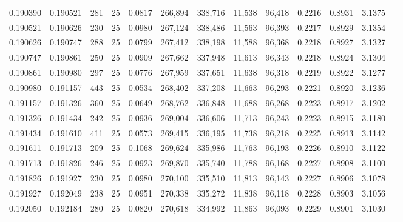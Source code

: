 \begin{tabular}{rrrrrrrrrrrrr}
0.190390 & 0.190521 &   281 &  25 &                                     0.0817 & 266,894 & 338,716 &  11,538 &  96,418 & 0.2216 & 0.8931 & 3.1375 \\
0.190521 & 0.190626 &   230 &  25 &                                     0.0980 & 267,124 & 338,486 &  11,563 &  96,393 & 0.2217 & 0.8929 & 3.1354 \\
0.190626 & 0.190747 &   288 &  25 &                                     0.0799 & 267,412 & 338,198 &  11,588 &  96,368 & 0.2218 & 0.8927 & 3.1327 \\
0.190747 & 0.190861 &   250 &  25 &                                     0.0909 & 267,662 & 337,948 &  11,613 &  96,343 & 0.2218 & 0.8924 & 3.1304 \\
0.190861 & 0.190980 &   297 &  25 &                                     0.0776 & 267,959 & 337,651 &  11,638 &  96,318 & 0.2219 & 0.8922 & 3.1277 \\
0.190980 & 0.191157 &   443 &  25 &                                     0.0534 & 268,402 & 337,208 &  11,663 &  96,293 & 0.2221 & 0.8920 & 3.1236 \\
0.191157 & 0.191326 &   360 &  25 &                                     0.0649 & 268,762 & 336,848 &  11,688 &  96,268 & 0.2223 & 0.8917 & 3.1202 \\
0.191326 & 0.191434 &   242 &  25 &                                     0.0936 & 269,004 & 336,606 &  11,713 &  96,243 & 0.2223 & 0.8915 & 3.1180 \\
0.191434 & 0.191610 &   411 &  25 &                                     0.0573 & 269,415 & 336,195 &  11,738 &  96,218 & 0.2225 & 0.8913 & 3.1142 \\
0.191611 & 0.191713 &   209 &  25 &                                     0.1068 & 269,624 & 335,986 &  11,763 &  96,193 & 0.2226 & 0.8910 & 3.1122 \\
0.191713 & 0.191826 &   246 &  25 &                                     0.0923 & 269,870 & 335,740 &  11,788 &  96,168 & 0.2227 & 0.8908 & 3.1100 \\
0.191826 & 0.191927 &   230 &  25 &                                     0.0980 & 270,100 & 335,510 &  11,813 &  96,143 & 0.2227 & 0.8906 & 3.1078 \\
0.191927 & 0.192049 &   238 &  25 &                                     0.0951 & 270,338 & 335,272 &  11,838 &  96,118 & 0.2228 & 0.8903 & 3.1056 \\
0.192050 & 0.192184 &   280 &  25 &                                     0.0820 & 270,618 & 334,992 &  11,863 &  96,093 & 0.2229 & 0.8901 & 3.1030 \\

\end{tabular}
